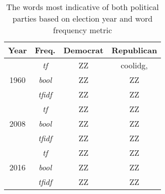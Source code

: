 \documentclass[aps, prl, reprint, showpacs]{revtex4-1}
\begin{document}
\begin{table} %
  \label{tab:results2}
  \begin{ruledtabular}
  \begin{tabular}{cccc}
  Year & Freq. & Democrat & Republican \\
    \hline
 & \textit{tf} & ZZ  & coolidg,   \\
1960 & \textit{bool} & ZZ  & ZZ  \\
 & \textit{tfidf} & ZZ  & ZZ  \\
 \hline
 & \textit{tf} & ZZ  & ZZ  \\
2008 & \textit{bool} & ZZ  & ZZ  \\
 & \textit{tfidf} & ZZ  & ZZ  \\
 \hline
 & \textit{tf} & ZZ  & ZZ  \\
2016 & \textit{bool} & ZZ  & ZZ  \\
 & \textit{tfidf} & ZZ  & ZZ  \\
 \hline
  \end{tabular}
  \end{ruledtabular}
    \caption{The words most indicative of both political parties based on election year and word frequency metric}
\end{table}
\end{document}
